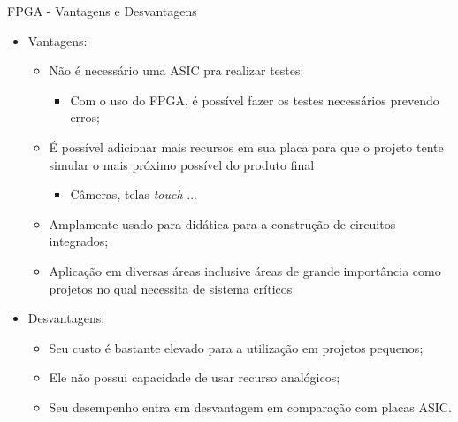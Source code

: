     
    	\begin{frame}{FPGA - Vantagens e Desvantagens}
            \vspace{-0.8em}
    		\begin{itemize}
    			\item Vantagens:
    			\begin{itemize}
    				\setlength\itemsep{0.2em}
    				\item Não é necessário uma ASIC pra realizar testes:
    				\begin{itemize}
    					\item Com o uso do FPGA, é possível fazer os testes necessários prevendo erros;
    				\end{itemize}
    
    				\item É possível adicionar mais recursos em sua placa para que o projeto tente simular o mais próximo possível do produto final
    				\begin{itemize}
    					\item Câmeras, telas \textit{touch} ...
    				\end{itemize}
    
    				\item Amplamente usado para didática para a construção de circuitos integrados;
    
    				\item Aplicação em diversas áreas inclusive áreas de grande importância como projetos no qual necessita de sistema críticos
    			\end{itemize}
    
    				\bigskip
    
    			\item Desvantagens:
    			\begin{itemize}
    				\setlength\itemsep{0.2em}
    				\item Seu custo é bastante elevado para a utilização em projetos pequenos;
    
    				\item Ele não possui capacidade de usar recurso analógicos;
    
    				\item Seu desempenho entra em desvantagem em comparação com placas ASIC.
    			\end{itemize}
    		\end{itemize}
    	\end{frame}
    
